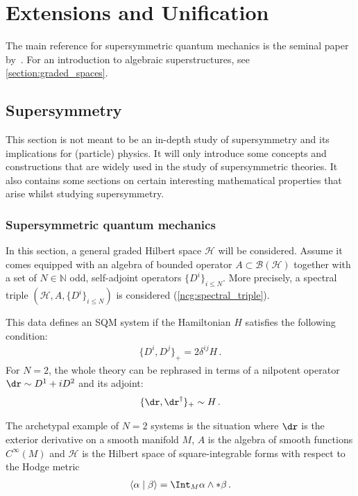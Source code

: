\chapter{Extensions and Unification}\label{chapter:unification}

    The main reference for supersymmetric quantum mechanics is the seminal paper by~\citet{witten_supersymmetry_1982}. For an introduction to algebraic superstructures, see \cref{section:graded_spaces}.

\section{Supersymmetry}

    This section is not meant to be an in-depth study of supersymmetry and its implications for (particle) physics. It will only introduce some concepts and constructions that are widely used in the study of supersymmetric theories. It also contains some sections on certain interesting mathematical properties that arise whilst studying supersymmetry.

\subsection{Supersymmetric quantum mechanics}

    In this section, a general graded Hilbert space $\mathcal{H}$ will be considered. Assume it comes equipped with an algebra of bounded operator $A\subset\mathcal{B}(\mathcal{H})$ together with a set of $N\in\mathbb{N}$ odd, self-adjoint operators $\{D^i\}_{i\leq N}$. More precisely, a spectral triple $(\mathcal{H},A,\{D^i\}_{i\leq N})$ is considered (\cref{ncg:spectral_triple}).

    This data defines an SQM system if the Hamiltonian $H$ satisfies the following condition:
    \begin{gather}
        \{D^i,D^j\}_+ = 2\delta^{ij}H\,.
    \end{gather}
    For $N=2$, the whole theory can be rephrased in terms of a nilpotent operator $\dr\sim D^1+iD^2$ and its adjoint:
    \begin{gather}
        \{\dr,\dr^\dagger\}_+\sim H\,.
    \end{gather}

    \begin{example}
        The archetypal example of $N=2$ systems is the situation where $\dr$ is the exterior derivative on a smooth manifold $M$, $A$ is the algebra of smooth functions $C^\infty(M)$ and $\mathcal{H}$ is the Hilbert space of square-integrable forms with respect to the Hodge metric
        \begin{gather}
            \langle\alpha\mid\beta\rangle = \Int_M\alpha\wedge\ast\beta\,.
        \end{gather}
    \end{example}

